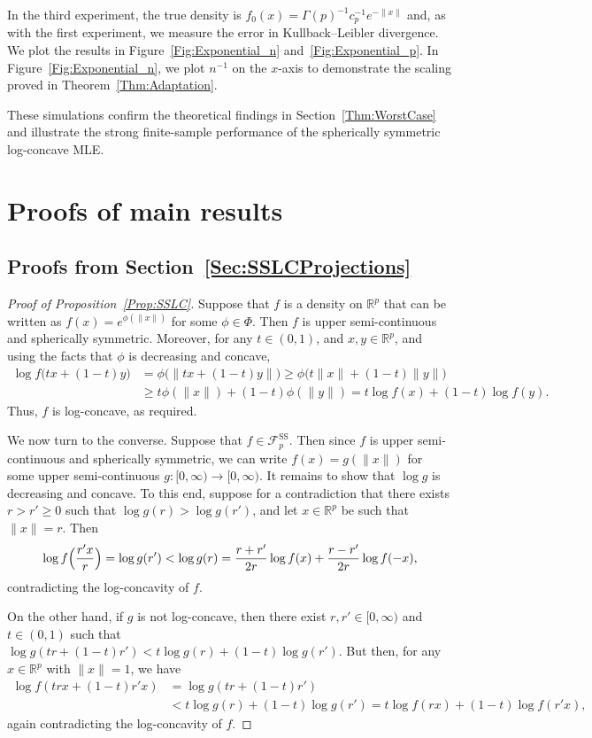 \documentclass[a4paper,12pt]{article}
\begin{document}
In the third experiment, the true density is $f_0(x) = \Gamma(p)^{-1} c_p^{-1} e^{- \| x \|} $ and, as with the first experiment, we measure the error in Kullback--Leibler divergence. We plot the results in Figure~\ref{Fig:Exponential_n} and~\ref{Fig:Exponential_p}. In Figure~\ref{Fig:Exponential_n}, we plot $n^{-1}$ on the $x$-axis to demonstrate the scaling proved in Theorem~\ref{Thm:Adaptation}.

These simulations confirm the theoretical findings in Section~\ref{Thm:WorstCase} and illustrate the strong finite-sample performance of the spherically symmetric log-concave MLE.

\section{Proofs of main results}

\subsection{Proofs from Section~\ref{Sec:SSLCProjections}}

\begin{proof}[Proof of Proposition~\ref{Prop:SSLC}]
Suppose that $f$ is a density on $\mathbb{R}^p$ that can be written as $f(x) = e^{\phi(\|x\|)}$ for some $\phi \in \Phi$. Then $f$ is upper semi-continuous and spherically symmetric.  Moreover, for any $t \in (0,1)$, and $x, y \in \mathbb{R}^p$, and using the facts that $\phi$ is decreasing and concave,
\begin{align*}
\log f \bigl( t x + (1 - t) y\bigr) &=  \phi\bigl( \| t x + (1- t) y \|\bigr) \geq  
    \phi\bigl( t \| x \| + (1 - t) \| y \| \bigr)\\
   &\geq t \phi( \|x\| ) + (1 - t) \phi( \| y \|) = t \log f (x) + (1-t) \log f(y).
\end{align*}
Thus, $f$ is log-concave, as required.

We now turn to the converse.  Suppose that $f \in \mathcal{F}_p^{\mathrm{SS}}$.  Then since $f$ is upper semi-continuous and spherically symmetric, we can write $f(x) = g(\|x\|)$ for some upper semi-continuous $g:[0,\infty) \rightarrow [0,\infty)$.  It remains to show that $\log g$ is decreasing and concave.  To this end, suppose for a contradiction that there exists $r > r' \geq 0$ such that $\log g(r) > \log g(r')$, and let $x \in \mathbb{R}^p$ be such that $\|x \| = r$. Then 
\[
\log f\Bigl(\frac{r'x}{r}\Bigr) = \log g(r') < \log g(r) = \frac{r+r'}{2r}\log f(x) + \frac{r-r'}{2r}\log f(-x),
\]
contradicting the log-concavity of $f$.

On the other hand, if $g$ is not log-concave, then there exist $r, r' \in [0,\infty)$ and $t \in (0,1)$ such that $\log g( t r + (1-t) r') < t \log g(r) + (1-t) \log g(r')$.  But then, for any $x \in \mathbb{R}^p$ with $\|x \| = 1$, we have 
\begin{align*}
\log f ( t rx + (1-t) r'x) &= \log g(t r + (1-t) r')  \\
   &< t \log g(r) + (1-t) \log g(r') = t \log f( rx ) + (1 - t) \log f( r'x ),
\end{align*}
again contradicting the log-concavity of $f$.
\end{proof}
\end{document}
